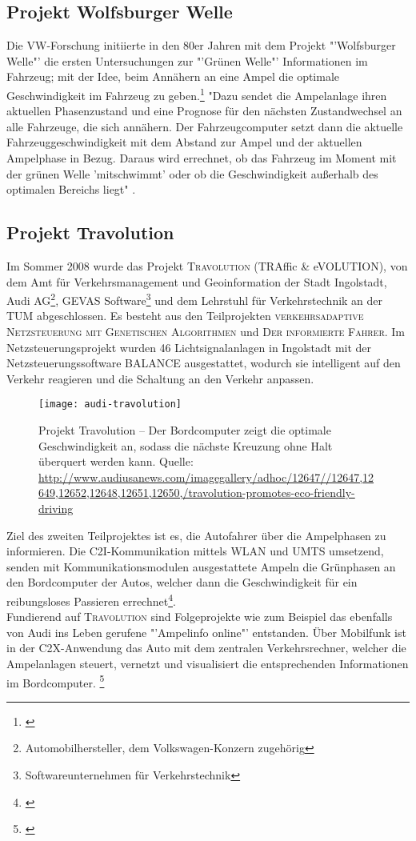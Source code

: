 \subsection{Projekt Wolfsburger Welle}
Die \gls{VW}-Forschung initiierte in den 80er Jahren mit dem Projekt "'Wolfsburger Welle"' die ersten Untersuchungen zur "'Grünen Welle"' Informationen im Fahrzeug; mit der Idee, beim Annähern an eine Ampel die optimale Geschwindigkeit im Fahrzeug zu geben.\footnote{\cite{Welle}} "Dazu sendet die Ampelanlage ihren aktuellen Phasenzustand und eine Prognose für den nächsten Zustandwechsel an alle Fahrzeuge, die sich annähern. Der Fahrzeugcomputer setzt dann die aktuelle Fahrzeuggeschwindigkeit mit dem Abstand zur Ampel und der aktuellen Ampelphase in Bezug. Daraus wird errechnet, ob das Fahrzeug im Moment mit der grünen Welle ’mitschwimmt’ oder ob die Geschwindigkeit außerhalb des optimalen Bereichs liegt" \cite{MenschMaschine}.
\subsection{Projekt Travolution}
Im Sommer 2008 wurde das Projekt \textsc{Travolution} (TRAffic \& eVOLUTION), von dem Amt für Verkehrsmanagement und Geoinformation der Stadt Ingolstadt, Audi AG\footnote{ Automobilhersteller, dem Volkswagen-Konzern zugehörig}, GEVAS Software\footnote{ Softwareunternehmen für Verkehrstechnik} und dem Lehrstuhl für Verkehrstechnik an der \gls{TUM} abgeschlossen. Es besteht aus den Teilprojekten \textsc{verkehrsadaptive Netzsteuerung mit Genetischen Algorithmen} und \textsc{Der informierte Fahrer}. Im Netzsteuerungsprojekt wurden 46 Lichtsignalanlagen in Ingolstadt mit der Netzsteuerungssoftware BALANCE ausgestattet, wodurch sie intelligent auf den Verkehr reagieren und die Schaltung an den Verkehr anpassen. 
\begin{figure}[H]  
    \centering  
    \texttt{[image: audi-travolution]}  \label{fig:travolution}
    \caption[Projekt Travolution]{Projekt Travolution -- Der Bordcomputer zeigt die optimale Geschwindigkeit an, sodass die nächste Kreuzung ohne Halt überquert werden kann. Quelle: {\url{http://www.audiusanews.com/imagegallery/adhoc/12647//12647,12649,12652,12648,12651,12650,/travolution-promotes-eco-friendly-driving}}}
\end{figure}
Ziel des zweiten Teilprojektes ist es, die Autofahrer über die Ampelphasen zu informieren. Die \gls{C2I}-Kommunikation mittels \gls{WLAN} und \gls{UMTS} umsetzend, senden mit Kommunikationsmodulen ausgestattete Ampeln die Grünphasen an den Bordcomputer der Autos, welcher dann die Geschwindigkeit für ein reibungsloses Passieren errechnet\footnote{\cite{Travolution, AudiTravolution}}.\\ 
Fundierend auf \textsc{Travolution} sind Folgeprojekte wie zum Beispiel das ebenfalls von Audi ins Leben gerufene "'Ampelinfo online"' entstanden. Über Mobilfunk ist in der \gls{C2X}-Anwendung das Auto mit dem zentralen Verkehrsrechner, welcher die Ampelanlagen steuert, vernetzt und visualisiert die entsprechenden Informationen im Bordcomputer. \footnote{\cite{Ampelinfo}}
